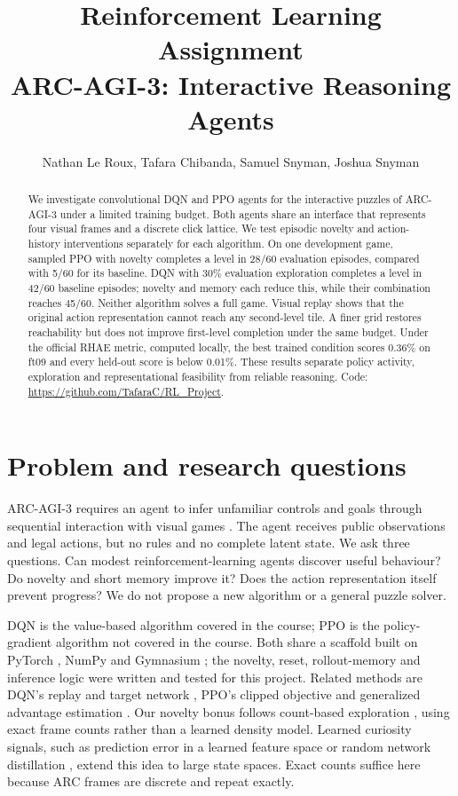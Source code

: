 \documentclass[10pt]{article}
\title{Reinforcement Learning Assignment\\ARC-AGI-3: Interactive Reasoning Agents}
\author{Nathan Le Roux, Tafara Chibanda, Samuel Snyman, Joshua Snyman}
\begin{document}
\maketitle
\begin{abstract}
We investigate convolutional DQN and PPO agents for the interactive puzzles of ARC-AGI-3 under a limited training budget. Both agents share an interface that represents four visual frames and a discrete click lattice. We test episodic novelty and action-history interventions separately for each algorithm. On one development game, sampled PPO with novelty completes a level in 28/60 evaluation episodes, compared with 5/60 for its baseline. DQN with 30\% evaluation exploration completes a level in 42/60 baseline episodes; novelty and memory each reduce this, while their combination reaches 45/60. Neither algorithm solves a full game. Visual replay shows that the original action representation cannot reach any second-level tile. A finer grid restores reachability but does not improve first-level completion under the same budget. Under the official RHAE metric, computed locally, the best trained condition scores 0.36\% on ft09 and every held-out score is below 0.01\%. These results separate policy activity, exploration and representational feasibility from reliable reasoning. Code: \url{https://github.com/TafaraC/RL_Project}.
\end{abstract}

\section{Problem and research questions}
ARC-AGI-3 requires an agent to infer unfamiliar controls and goals through sequential interaction with visual games \citep{arcagi3,arc2026}. The agent receives public observations and legal actions, but no rules and no complete latent state. We ask three questions. Can modest reinforcement-learning agents discover useful behaviour? Do novelty and short memory improve it? Does the action representation itself prevent progress? We do not propose a new algorithm or a general puzzle solver.

DQN is the value-based algorithm covered in the course; PPO is the policy-gradient algorithm not covered in the course. Both share a scaffold built on PyTorch \citep{paszke2019}, NumPy \citep{harris2020} and Gymnasium \citep{towers2024}; the novelty, reset, rollout-memory and inference logic were written and tested for this project. Related methods are DQN's replay and target network \citep{mnih2015}, PPO's clipped objective \citep{schulman2017} and generalized advantage estimation \citep{schulman2016}. Our novelty bonus follows count-based exploration \citep{strehl2008,bellemare2016}, using exact frame counts rather than a learned density model. Learned curiosity signals, such as prediction error in a learned feature space \citep{pathak2017} or random network distillation \citep{burda2019}, extend this idea to large state spaces. Exact counts suffice here because ARC frames are discrete and repeat exactly.
\end{document}
